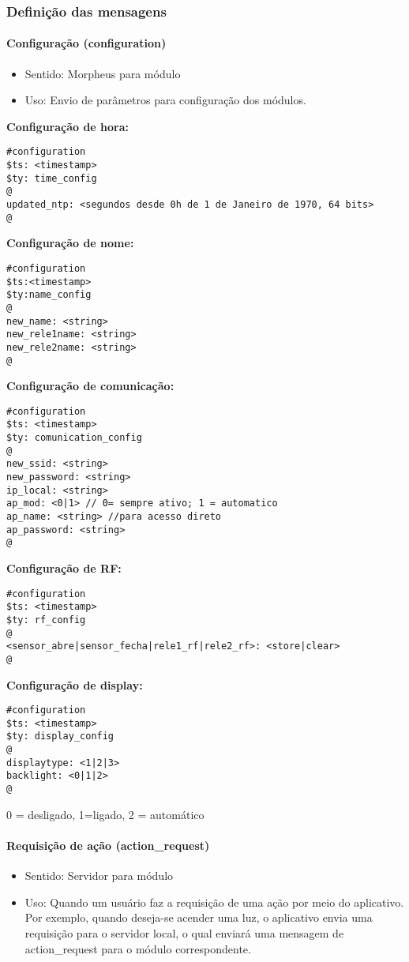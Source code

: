 \subsubsection{Definição das mensagens}

\paragraph{Configuração (configuration)}
\begin{itemize}
\item Sentido: Morpheus para módulo
\item Uso: Envio de parâmetros para configuração dos módulos.
\end{itemize}

\textbf{Configuração de hora:}
\begin{lstlisting}
#configuration
$ts: <timestamp>
$ty: time_config
@
updated_ntp: <segundos desde 0h de 1 de Janeiro de 1970, 64 bits>
@
\end{lstlisting}

\textbf{Configuração de nome:}
\begin{lstlisting}
#configuration
$ts:<timestamp>
$ty:name_config
@
new_name: <string>
new_rele1name: <string>
new_rele2name: <string>
@
\end{lstlisting}

\textbf{Configuração de comunicação:}
\begin{lstlisting}
#configuration
$ts: <timestamp>
$ty: comunication_config
@
new_ssid: <string>
new_password: <string>
ip_local: <string>
ap_mod: <0|1> // 0= sempre ativo; 1 = automatico
ap_name: <string> //para acesso direto
ap_password: <string>
@
\end{lstlisting}

\textbf{Configuração de RF:}
\begin{lstlisting}
#configuration
$ts: <timestamp>
$ty: rf_config
@
<sensor_abre|sensor_fecha|rele1_rf|rele2_rf>: <store|clear>
@
\end{lstlisting}

\textbf{Configuração de display:}
\begin{lstlisting}
#configuration
$ts: <timestamp>
$ty: display_config
@
displaytype: <1|2|3>
backlight: <0|1|2>
@
\end{lstlisting}
0 = desligado, 1=ligado, 2 = automático

\paragraph{Requisição de ação (action\_request)}
\begin{itemize}
\item Sentido: Servidor para módulo
\item Uso: Quando um usuário faz a requisição de uma ação por meio do aplicativo. Por exemplo, quando deseja-se acender uma luz, o aplicativo envia uma requisição para o servidor local, o qual enviará uma mensagem de action\_request para o módulo correspondente.
\end{itemize}

